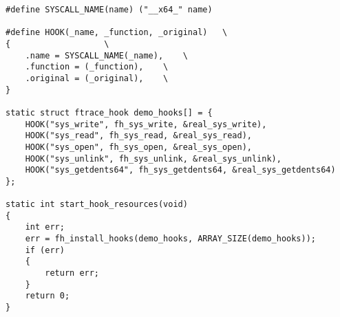 \begin{lstlisting}[label=code:hook1,caption=Файл hook.h]
#define SYSCALL_NAME(name) ("__x64_" name)

#define HOOK(_name, _function, _original)	\
{					\
	.name = SYSCALL_NAME(_name),	\
	.function = (_function),	\
	.original = (_original),	\
}

static struct ftrace_hook demo_hooks[] = {
	HOOK("sys_write", fh_sys_write, &real_sys_write),
	HOOK("sys_read", fh_sys_read, &real_sys_read),
	HOOK("sys_open", fh_sys_open, &real_sys_open),
	HOOK("sys_unlink", fh_sys_unlink, &real_sys_unlink),
	HOOK("sys_getdents64", fh_sys_getdents64, &real_sys_getdents64)
};

static int start_hook_resources(void)
{
	int err;
	err = fh_install_hooks(demo_hooks, ARRAY_SIZE(demo_hooks));
	if (err)
	{
		return err;
	}
	return 0;
}
\end{lstlisting}


